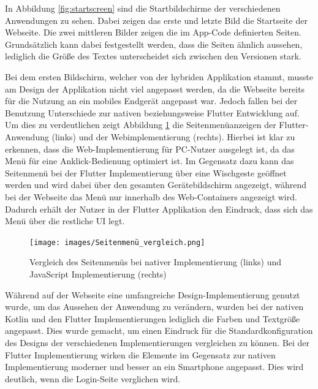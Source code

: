 In Abbildung \ref{fig:startscreen} sind die Startbildschirme der verschiedenen Anwendungen zu sehen. Dabei zeigen das erste und letzte Bild die Startseite der Webseite. Die zwei mittleren Bilder zeigen die im App-Code definierten Seiten. Grundsätzlich kann dabei festgestellt werden, dass die Seiten ähnlich aussehen, lediglich die Größe des Textes unterscheidet sich zwischen den Versionen stark.

Bei dem ersten Bildschirm, welcher von der hybriden Applikation stammt, musste am Design der Applikation nicht viel angepasst werden, da die Webseite bereits für die Nutzung an ein mobiles Endgerät angepasst war. Jedoch fallen bei der Benutzung Unterschiede zur nativen beziehungsweise Flutter Entwicklung auf. 
Um dies zu verdeutlichen zeigt Abbildung \ref{fig:sidemenu} die Seitenmenüanzeigen der Flutter-Anwendung (links) und der Webimplementierung (rechts). Hierbei ist klar zu erkennen, dass die Web-Implementierung für PC-Nutzer ausgelegt ist, da das Menü für eine Anklick-Bedienung optimiert ist. 
Im Gegensatz dazu kann das Seitenmenü bei der Flutter Implementierung über eine Wischgeste geöffnet werden und wird dabei über den gesamten Gerätebildschirm angezeigt, während bei der Webseite das Menü nur innerhalb des Web-Containers angezeigt wird. Dadurch erhält der Nutzer in der Flutter Applikation den Eindruck, dass sich das Menü über die restliche UI legt. 
\begin{figure}[ht]
  \centering
  \texttt{[image: images/Seitenmenü\_vergleich.png]} 
  \caption[Vergleich des Seitenmenüs der nativen und hybriden Applikation]{Vergleich des Seitenmenüs bei nativer Implementierung (links) und JavaScript Implementierung (rechts)}
  \label{fig:sidemenu}
\end{figure}

Während auf der Webseite eine umfangreiche Design-Implementierung genutzt wurde, um das Aussehen der Anwendung zu verändern, wurden bei der nativen Kotlin und den Flutter Implementierungen lediglich die Farben und Textgröße angepasst. Dies wurde gemacht, um einen Eindruck für die Standardkonfiguration des Designs der verschiedenen Implementierungen vergleichen zu können. Bei der Flutter Implementierung wirken die Elemente im Gegensatz zur nativen Implementierung moderner und besser an ein Smartphone angepasst. Dies wird deutlich, wenn die Login-Seite verglichen wird.

